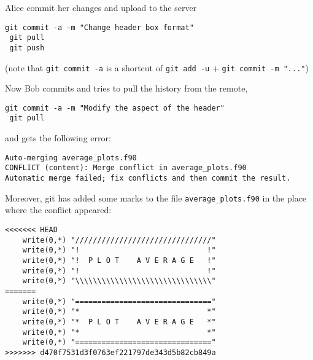 \documentclass[a4paper,10pt]{article}
\begin{document}
Alice commit her changes and upload to the server

\begin{lstlisting}[style=Alice]
 git commit -a -m "Change header box format"
 git pull
 git push
\end{lstlisting}
(note that \texttt{git commit -a} is a shortcut of \texttt{git add -u} + \texttt{git commit -m "..."})

Now Bob commits and tries to pull the history from the remote,

\begin{lstlisting}[style=Bob]
 git commit -a -m "Modify the aspect of the header"
 git pull
\end{lstlisting}
and gets the following error:

\begin{lstlisting}[style=Output]
Auto-merging average_plots.f90
CONFLICT (content): Merge conflict in average_plots.f90
Automatic merge failed; fix conflicts and then commit the result.
\end{lstlisting}

Moreover, git has added some marks to the file \texttt{average\_plots.f90} in the place where the conflict appeared:

\begin{lstlisting}[style=Text]
<<<<<<< HEAD
    write(0,*) "///////////////////////////////"
    write(0,*) "!                             !"
    write(0,*) "!  P L O T    A V E R A G E   !"
    write(0,*) "!                             !"
    write(0,*) "\\\\\\\\\\\\\\\\\\\\\\\\\\\\\\\"
=======
    write(0,*) "==============================="
    write(0,*) "*                             *"
    write(0,*) "*  P L O T    A V E R A G E   *"
    write(0,*) "*                             *"
    write(0,*) "==============================="
>>>>>>> d470f7531d3f0763ef221797de343d5b82cb849a
\end{lstlisting}
\end{document}
